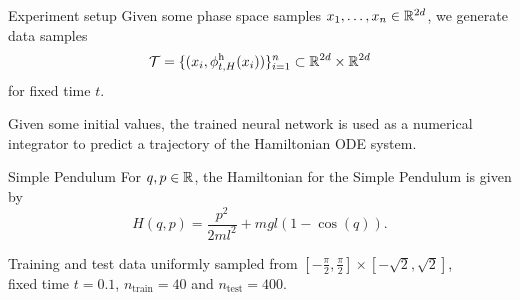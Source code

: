 \begin{frame}[c]{Experiment setup}
   {
  Given some phase space samples $x_1, \dots, x_n \in \mathbb{R}^{2d}$, we generate data samples 
  \begin{equation*}
    \mathcal{T} = \{ (x_i, \phi^{\text{h}}_{t,H}(x_i)) \}_{i=1}^{n}
    \subset \mathbb{R}^{2d} \times \mathbb{R}^{2d}
  \end{equation*}
  for fixed time $t$.
  }

   {
  \vspace{0.6cm}
   Given some initial values,
  the trained neural network is used as a numerical integrator
  to predict a trajectory of the Hamiltonian ODE system.
  }
\end{frame}

\begin{frame}[c]{Simple Pendulum}
   {
  For $q,p \in \mathbb{R}$, the Hamiltonian for the Simple Pendulum is given by
  \begin{equation*}
    H(q,p) = \frac{p^2}{2ml^2} + mgl (1-\cos(q))
    .
  \end{equation*}
  }

   {
  \vspace{0.6cm}
  Training and test data uniformly sampled from
  $[-\frac{\pi}{2}, \frac{\pi}{2}] \times [-\sqrt{2}, \sqrt{2}]$,\\
  fixed time $t = 0.1$,
  $n_{\text{train}} = 40$ and $n_{\text{test}} = 400$.
  }
\end{frame}

